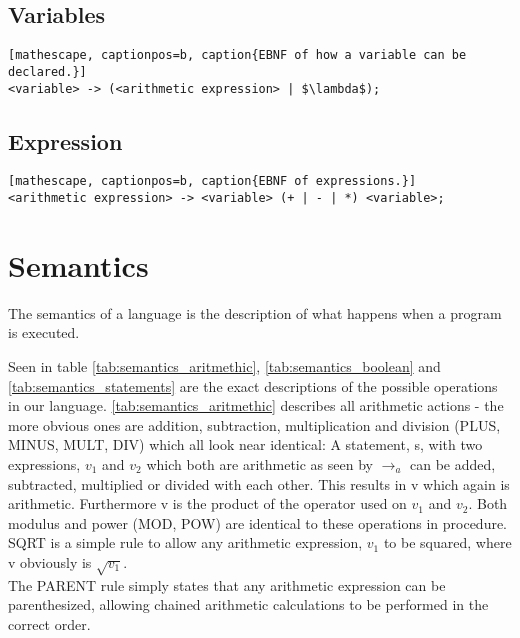 \subsection{Variables}
\begin{lstlisting}[mathescape, captionpos=b, caption{EBNF of how a variable can be declared.}]
<variable> -> (<arithmetic expression> | $\lambda$);
\end{lstlisting}

\subsection{Expression}
\begin{lstlisting}[mathescape, captionpos=b, caption{EBNF of expressions.}]
<arithmetic expression> -> <variable> (+ | - | *) <variable>;
\end{lstlisting}

\section{Semantics}
The semantics of a language is the description of what happens when a program is executed.

Seen in table \ref{tab:semantics_aritmethic}, \ref{tab:semantics_boolean} and \ref{tab:semantics_statements} are the exact descriptions of the possible operations in our language. \ref{tab:semantics_aritmethic} describes all arithmetic actions - the more obvious ones are addition, subtraction, multiplication and division (PLUS, MINUS, MULT, DIV) which all look near identical: A statement, s, with two expressions, $v_{1}$ and $v_{2}$ which both are arithmetic as seen by $\rightarrow_{a}$ can be added, subtracted, multiplied or divided with each other. This results in v which again is arithmetic. Furthermore v is the product of the operator used on $v_{1}$ and $v_{2}$. Both modulus and power (MOD, POW) are identical to these operations in procedure. \\
SQRT is a simple rule to allow any arithmetic expression, $v_{1}$ to be squared, where v obviously is $\sqrt{v_{1}}$. \\
The PARENT rule simply states that any arithmetic expression can be parenthesized, allowing chained arithmetic calculations to be performed in the correct order. \\  \\


